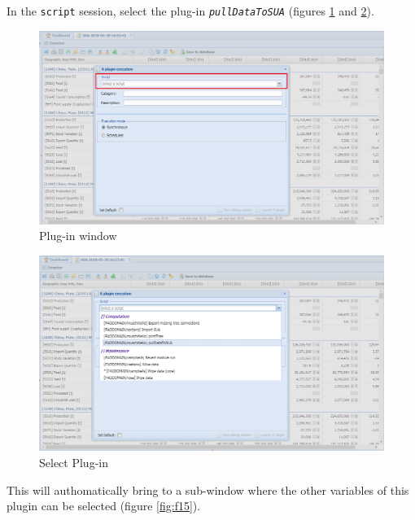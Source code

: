 \documentclass[]{article}
\begin{document}
In the \texttt{script} session, select the plug-in
\emph{\texttt{pullDataToSUA}} (figures \ref{fig:f13} and \ref{fig:f14}).

\begin{figure}[H]

{\centering \includegraphics[width=1\linewidth]{images/pullData/13_pluginWindow} 

}

\caption{\label{fig:f13}Plug-in window}\label{fig:f13}
\end{figure}

\begin{figure}[H]

{\centering \includegraphics[width=1\linewidth]{images/pullData/14_selectPlugin} 

}

\caption{\label{fig:f14}Select Plug-in}\label{fig:f14}
\end{figure}

This will authomatically bring to a sub-window where the other variables
of this plugin can be selected (figure \ref{fig:f15}).
\end{document}
